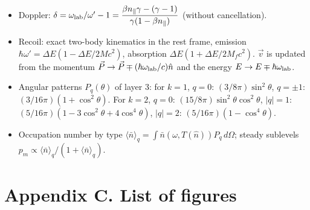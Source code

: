\documentclass[
  a4paper,
]{article}
\providecommand{\tightlist}{%
  \setlength{\itemsep}{0pt}\setlength{\parskip}{0pt}}
\begin{document}
\begin{itemize}
\tightlist
\item
  Doppler:
  \(\delta=\omega_{\rm lab}/\omega'-1=\dfrac{\beta n_\parallel\gamma-(\gamma-1)}{\gamma(1-\beta n_\parallel)}\)
  (without cancellation).
\item
  Recoil: exact two-body kinematics in the rest frame, emission
  \(\hbar\omega'=\Delta E(1-\Delta E/2Mc^2)\), absorption
  \(\Delta E(1+\Delta E/2M_fc^2)\). \(\vec v\) is updated from the
  momentum \(\vec P\to\vec P\mp(\hbar\omega_{\rm lab}/c)\hat n\) and the
  energy \(E\to E\mp\hbar\omega_{\rm lab}\).
\item
  Angular patterns \(P_q(\theta)\) of layer 3: for \(k=1\), \(q=0\):
  \((3/8\pi)\sin^2\theta\), \(q=\pm1\): \((3/16\pi)(1+\cos^2\theta)\).
  For \(k=2\), \(q=0\): \((15/8\pi)\sin^2\theta\cos^2\theta\),
  \(|q|=1\): \((5/16\pi)(1-3\cos^2\theta+4\cos^4\theta)\), \(|q|=2\):
  \((5/16\pi)(1-\cos^4\theta)\).
\item
  Occupation number by type
  \(\langle\bar n\rangle_q=\int\bar n(\omega,T(\hat n))P_q\,d\Omega\);
  steady sublevels
  \(p_m\propto\langle\bar n\rangle_q/(1+\langle\bar n\rangle_q)\).
\end{itemize}

\section{Appendix C. List of figures}\label{appendix-c.-list-of-figures}
\end{document}
